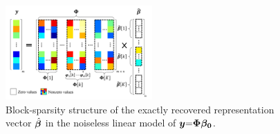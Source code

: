 \begin{figure}[!b]
\centering
\includegraphics[width=0.5\textwidth]{images/Block-Sparsity-Structure.png} %
\caption{Block-sparsity structure of the exactly recovered representation vector $\hat{\boldsymbol{\beta}}$ in the noiseless linear model of $\boldsymbol{y} {=} \boldsymbol{\Phi} \boldsymbol{\beta_0}$.}
\label{fig:Block-Sparsity-Structure}
\end{figure}